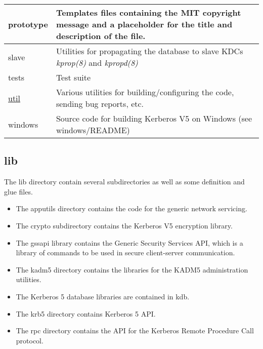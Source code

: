 \documentclass[letterpaper,10pt,english]{sphinxmanual}
\begin{document}
\begin{tabulary}{\linewidth}{|L|L|}
prototype
 & 
Templates files containing the MIT copyright message and a placeholder for the title and description of the file.
\\\hline

slave
 & 
Utilities for propagating the database to slave KDCs \emph{kprop(8)} and \emph{kpropd(8)}
\\\hline

tests
 & 
Test suite
\\\hline

{\hyperref[build/directory_org:util]{util}}
 & 
Various utilities for building/configuring the code, sending bug reports, etc.
\\\hline

windows
 & 
Source code for building Kerberos V5 on Windows (see windows/README)
\\\hline
\end{tabulary}



\subsection{lib}
\label{build/directory_org:lib}\label{build/directory_org:id1}
The lib directory contain several subdirectories as well as some
definition and glue files.
\begin{itemize}
\item {} 
The apputils directory contains the code for the generic network
servicing.

\item {} 
The crypto subdirectory contains the Kerberos V5 encryption
library.

\item {} 
The gssapi library contains the Generic Security Services API,
which is a library of commands to be used in secure client-server
communication.

\item {} 
The kadm5 directory contains the libraries for the KADM5
administration utilities.

\item {} 
The Kerberos 5 database libraries are contained in kdb.

\item {} 
The krb5 directory contains Kerberos 5 API.

\item {} 
The rpc directory contains the API for the Kerberos Remote
Procedure Call protocol.

\end{itemize}
\end{document}
